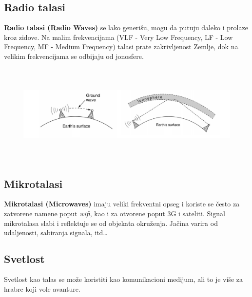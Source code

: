 \documentclass[a4paper]{article}
\begin{document}
        \subsection{Radio talasi}
        \textbf{Radio talasi (Radio Waves)} se lako generišu, mogu da putuju daleko i prolaze kroz zidove. Na malim 
        frekvencijama (VLF - Very Low Frequency, LF - Low Frequency, MF - Medium Frequency) talasi prate zakrivljenost 
        Zemlje, dok na velikim frekvencijama se odbijaju od jonosfere.
        \begin{figure}[H]
            \begin{center}
                \includegraphics[width=125mm,height=50mm]{Slike/radio_talasi.png}
            \end{center}
        \end{figure}
        \subsection{Mikrotalasi}
        \textbf{Mikrotalasi (Microwaves)} imaju veliki frekventni opseg i koriste se često za zatvorene namene
        poput \textit{wifi}, kao i za otvorene poput 3G i sateliti. Signal mikrotalasa slabi i reflektuje
        se od objekata okruženja. Jačina varira od udaljenosti, sabiranja signala, itd\dots
        \subsection{Svetlost}
        Svetlost kao talas se može koristiti kao komunikacioni medijum, ali to je više za hrabre
        koji vole avanture.
\end{document}
